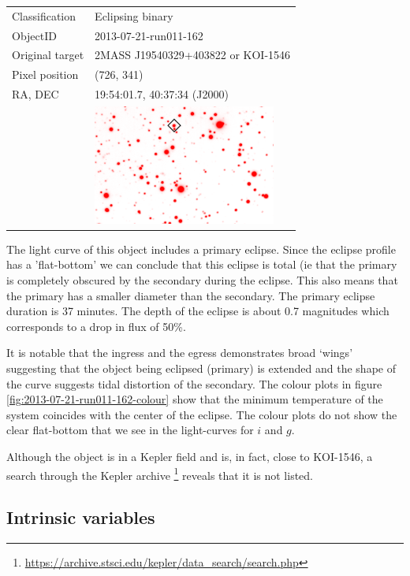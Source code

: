 \begin{tabular}{l l}
  Classification & Eclipsing binary \\
  ObjectID & 2013-07-21-run011-162 \\
  Original target & 2MASS J19540329+403822 or KOI-1546 \\
  Pixel position & (726, 341) \\
  RA, DEC & 19:54:01.7, 40:37:34 (J2000) \\
       & \includegraphics[width=60mm]{images/2013-07-21-run011-162.png} \\
\end{tabular}

The light curve of this object includes a primary eclipse. Since the eclipse profile has a 'flat-bottom' we can conclude that this eclipse is total (ie that the primary is completely obscured by the secondary during the eclipse. This also means that the primary has a smaller diameter than the secondary. The primary eclipse duration is 37 minutes. The depth of the eclipse is about 0.7 magnitudes which corresponds to a drop in flux of 50\%. 

It is notable that the ingress and the egress demonstrates broad `wings' suggesting that the object being eclipsed (primary) is extended and the shape of the curve suggests tidal distortion of the secondary. The colour plots in figure \ref{fig:2013-07-21-run011-162-colour} show that the minimum temperature of the system coincides with the center of the eclipse. The colour plots do not show the clear flat-bottom that we see in the light-curves for $i$ and $g$. 

Although the object is in a Kepler field and is, in fact, close to KOI-1546, a search through the Kepler archive \footnote{\url{https://archive.stsci.edu/kepler/data_search/search.php}} reveals that it is not listed. 

\newpage


\subsection{Intrinsic variables}


